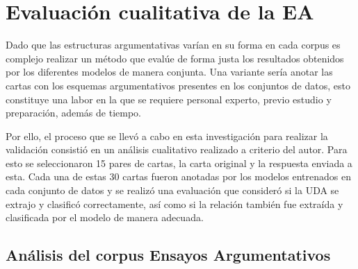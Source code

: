 \documentclass[a4paper,11pt,twocolumn,twoside]{article}
\begin{document}
\section{Evaluación cualitativa de la EA}

Dado que las estructuras argumentativas varían en su forma en cada corpus es complejo realizar un método que evalúe de forma 
justa los resultados obtenidos por los diferentes modelos de manera conjunta. Una variante sería anotar las cartas 
con los esquemas argumentativos presentes en los conjuntos de datos, esto constituye una labor en la que se requiere
personal experto, previo estudio y preparación, además de tiempo. 

Por ello, el proceso que se llevó a cabo en esta investigación para realizar la 
validación consistió en un análisis cualitativo realizado a criterio del autor. Para esto se seleccionaron 15 pares 
de cartas, la carta original y la respuesta enviada a esta. Cada una de estas 30 cartas fueron anotadas por los modelos entrenados en cada 
conjunto de datos y se realizó una evaluación que consideró si la UDA se extrajo y clasificó correctamente, 
así como si la relación también fue extraída y clasificada por el modelo de manera adecuada.


\subsection{Análisis del corpus Ensayos Argumentativos}

\end{document}
